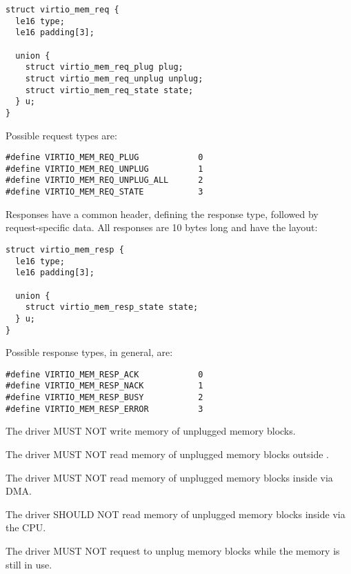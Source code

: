 \begin{lstlisting}
struct virtio_mem_req {
  le16 type;
  le16 padding[3];

  union {
    struct virtio_mem_req_plug plug;
    struct virtio_mem_req_unplug unplug;
    struct virtio_mem_req_state state;
  } u;
}
\end{lstlisting}

Possible request types are:

\begin{lstlisting}
#define VIRTIO_MEM_REQ_PLUG            0
#define VIRTIO_MEM_REQ_UNPLUG          1
#define VIRTIO_MEM_REQ_UNPLUG_ALL      2
#define VIRTIO_MEM_REQ_STATE           3
\end{lstlisting}

Responses have a common header, defining the response type, followed by
request-specific data.  All responses are 10 bytes long and have the layout:

\begin{lstlisting}
struct virtio_mem_resp {
  le16 type;
  le16 padding[3];

  union {
    struct virtio_mem_resp_state state;
  } u;
}
\end{lstlisting}

Possible response types, in general, are:

\begin{lstlisting}
#define VIRTIO_MEM_RESP_ACK            0
#define VIRTIO_MEM_RESP_NACK           1
#define VIRTIO_MEM_RESP_BUSY           2
#define VIRTIO_MEM_RESP_ERROR          3
\end{lstlisting}


The driver MUST NOT write memory of unplugged memory blocks.

The driver MUST NOT read memory of unplugged memory blocks outside
.

The driver MUST NOT read memory of unplugged memory blocks inside
 via DMA.

The driver SHOULD NOT read memory of unplugged memory blocks inside
 via the CPU.

The driver MUST NOT request to unplug memory blocks while the memory is
still in use.

